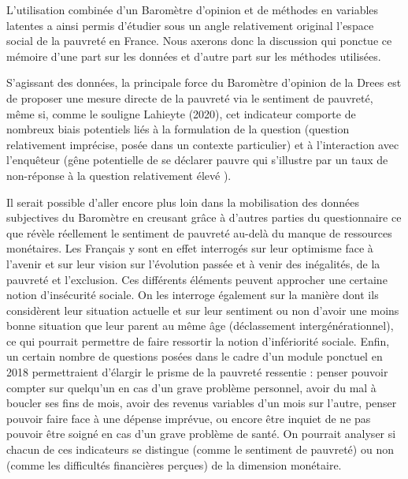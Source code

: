 \documentclass[12pt,a4paper]{reedthesis}
\begin{document}
L'utilisation combinée d'un Baromètre d'opinion et de méthodes en variables latentes a ainsi permis d'étudier sous un angle relativement original l'espace social de la pauvreté en France. Nous axerons donc la discussion qui ponctue ce mémoire d'une part sur les données et d'autre part sur les méthodes utilisées.

S'agissant des données, la principale force du Baromètre d'opinion de la Drees est de proposer une mesure directe de la pauvreté via le sentiment de pauvreté, même si, comme le souligne Lahieyte (2020), cet indicateur comporte de nombreux biais potentiels liés à la formulation de la question (question relativement imprécise, posée dans un contexte particulier) et à l'interaction avec l'enquêteur (gêne potentielle de se déclarer pauvre qui s'illustre par un taux de non-réponse à la question relativement élevé ).

Il serait possible d'aller encore plus loin dans la mobilisation des données subjectives du Baromètre en creusant grâce à d'autres parties du questionnaire ce que révèle réellement le sentiment de pauvreté au-delà du manque de ressources monétaires. Les Français y sont en effet interrogés sur leur optimisme face à l'avenir et sur leur vision sur l'évolution passée et à venir des inégalités, de la pauvreté et l'exclusion. Ces différents éléments peuvent approcher une certaine notion d'insécurité sociale. On les interroge également sur la manière dont ils considèrent leur situation actuelle et sur leur sentiment ou non d'avoir une moins bonne situation que leur parent au même âge (déclassement intergénérationnel), ce qui pourrait permettre de faire ressortir la notion d'infériorité sociale. Enfin, un certain nombre de questions posées dans le cadre d'un module ponctuel en 2018 permettraient d'élargir le prisme de la pauvreté ressentie : penser pouvoir compter sur quelqu'un en cas d'un grave problème personnel, avoir du mal à boucler ses fins de mois, avoir des revenus variables d'un mois sur l'autre, penser pouvoir faire face à une dépense imprévue, ou encore être inquiet de ne pas pouvoir être soigné en cas d'un grave problème de santé. On pourrait analyser si chacun de ces indicateurs se distingue (comme le sentiment de pauvreté) ou non (comme les difficultés financières perçues) de la dimension monétaire.
\end{document}
